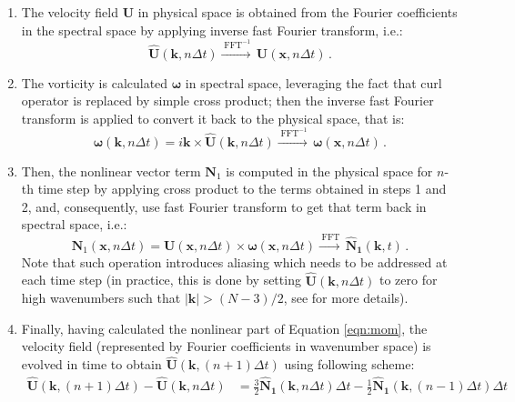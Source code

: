 \documentclass{pracamgren}
\begin{document}
\begin{enumerate}
\item The velocity field $\mathbf{U}$ in physical space is obtained from the Fourier coefficients in the spectral space by applying inverse fast Fourier transform, i.e.:
\begin{equation}
\mathbf{\hat{U}}(\mathbf{k}, n \Delta t) \xrightarrow{\; \text{FFT}^{-1}} \, \mathbf{U}(\mathbf{x}, n \Delta t) \, .
\label{eqn:psproc-1}
\end{equation}
\item The vorticity is calculated $\boldsymbol{\hat{\omega}}$ in spectral space, leveraging the fact that curl operator is replaced by simple cross product; then the inverse fast Fourier transform is applied to convert it back to the physical space, that is:
\begin{equation}
\boldsymbol{\hat{\omega}}(\mathbf{k}, n \Delta t) = i \mathbf{k} \times \mathbf{\hat{U}}(\mathbf{k}, n \Delta t) \xrightarrow{\; \text{FFT}^{-1}} \, \boldsymbol{\omega}(\mathbf{x}, n \Delta t) \, .
\label{eqn:psproc-2}
\end{equation}
\item Then, the nonlinear vector term $\mathbf{N}_1$ is computed in the physical space for $n$-th time step by applying cross product to the terms obtained in steps 1 and 2, and, consequently, use fast Fourier transform to get that term back in spectral space, i.e.:
\begin{equation}
\mathbf{N}_1(\mathbf{x}, n \Delta t) = \mathbf{U}(\mathbf{x}, n \Delta t) \times \boldsymbol{\omega}(\mathbf{x}, n \Delta t) \xrightarrow{\; \text{FFT}} \, \mathbf{\hat{N}_1}(\mathbf{k}, t) \, .
\label{eqn:psproc-3}
\end{equation}
Note that such operation introduces aliasing which needs to be addressed at each time step (in practice, this is done by setting $\mathbf{\hat{U}}(\mathbf{k}, n \Delta t)$ to zero for high wavenumbers such that ${|\mathbf{k}| > (N - 3) / 2}$, see \textcite{Rosa2015} for more details).
\item Finally, having calculated the nonlinear part of Equation \ref{eqn:mom}, the velocity field (represented by Fourier coefficients in wavenumber space) is evolved in time to obtain ${\mathbf{\hat{U}}(\mathbf{k}, (n+1) \Delta t)}$ using following scheme:
\begin{align}
\mathbf{\hat{U}}(\mathbf{k}, (n+1) \Delta t) - \mathbf{\hat{U}}(\mathbf{k}, n \Delta t)
&= \frac{3}{2} \mathbf{\hat{N}_1}(\mathbf{k}, n \Delta t) \Delta t - \frac{1}{2} \mathbf{\hat{N}_1}(\mathbf{k}, (n-1) \Delta t) \Delta t \label{eqn:psproc-4.1} \\

\end{align}
\end{enumerate}
\end{document}
